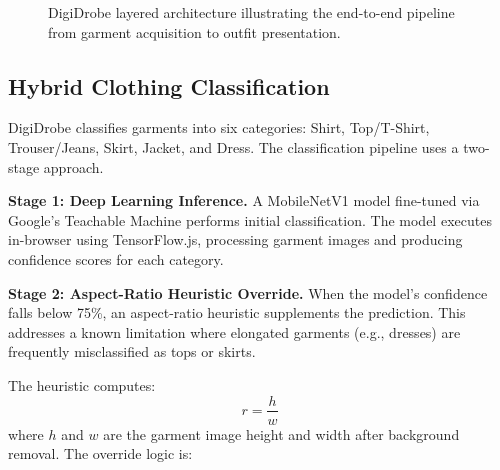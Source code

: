 \documentclass[conference]{IEEEtran}
\begin{document}
\begin{figure}[htbp]
\centerline{}
\caption{DigiDrobe layered architecture illustrating the end-to-end pipeline from garment acquisition to outfit presentation.}
\label{fig:architecture}
\end{figure}

\subsection{Hybrid Clothing Classification}

DigiDrobe classifies garments into six categories: Shirt, Top/T-Shirt, Trouser/Jeans, Skirt, Jacket, and Dress. The classification pipeline uses a two-stage approach.

\textbf{Stage 1: Deep Learning Inference.} A MobileNetV1 model fine-tuned via Google's Teachable Machine performs initial classification. The model executes in-browser using TensorFlow.js, processing garment images and producing confidence scores for each category.

\textbf{Stage 2: Aspect-Ratio Heuristic Override.} When the model's confidence falls below 75\%, an aspect-ratio heuristic supplements the prediction. This addresses a known limitation where elongated garments (e.g., dresses) are frequently misclassified as tops or skirts.

The heuristic computes:
\begin{equation}
    r = \frac{h}{w}
\end{equation}
where $h$ and $w$ are the garment image height and width after background removal. The override logic is:
\end{document}
